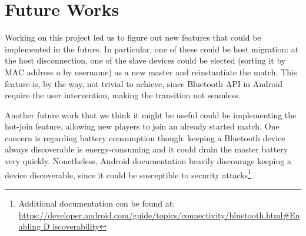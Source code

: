\section{Future Works}

Working on this project led us to figure out new features that could be 
implemented in the future. In particular, one of these could be host migration: 
at the host disconnection, one of the slave devices could be elected (sorting it 
by MAC address o by username) as a new master and reinstantiate the match. This 
feature is, by the way, not trivial to achieve, since Bluetooth API in Android 
require the user intervention, making the transition not seamless.

Another future work that we think it might be useful could be implementing 
the hot-join feature, allowing new players to join an already started match. 
One concern is regarding battery consumption though: keeping a Bluetooth device 
always discoverable is energy-consuming and it could drain the master battery 
very quickly. Nonetheless, Android documentation heavily discourage keeping a 
device discoverable, since it could be susceptible to security 
attacks\footnote{Additional documentation con be found at: \url{ 
https://developer.android.com/guide/topics/connectivity/bluetooth.html\#Enabling
D 
iscoverability}}.